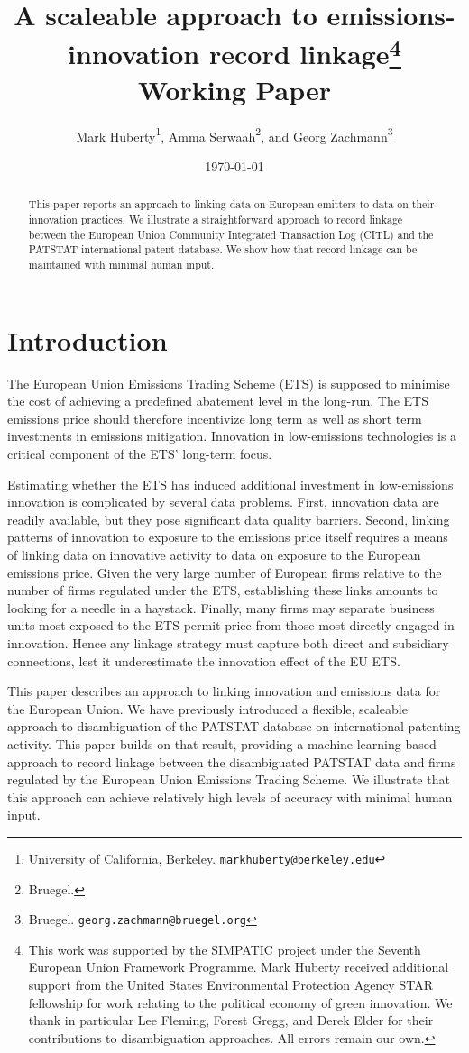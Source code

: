 \documentclass[11pt]{article}
\title{A scaleable approach to emissions-innovation record linkage\thanks{This
    work was supported by the SIMPATIC project under the Seventh European Union Framework Programme. Mark Huberty received additional support from the United States
    Environmental Protection Agency STAR fellowship for work relating to
    the political economy of green innovation. We thank in particular
    Lee Fleming, Forest Gregg, and Derek Elder for their contributions
    to disambiguation approaches. All errors remain our own.}\\
  Working Paper}
\author{Mark Huberty\thanks{University of California,
    Berkeley. \texttt{markhuberty@berkeley.edu}}, Amma
  Serwaah\thanks{Bruegel.}, and Georg Zachmann\thanks{Bruegel. \texttt{georg.zachmann@bruegel.org}}}
\date{\today}
\begin{document}
\maketitle
\doublespacing

\begin{abstract}
  This paper reports an approach to linking data on European emitters
  to data on their innovation practices. We illustrate a
  straightforward approach to record linkage between the European
  Union Community Integrated Transaction Log (CITL) and the PATSTAT
  international patent database. We show how that record linkage can
  be maintained with minimal human input. 
\end{abstract}

\section{Introduction}
\label{sec:introduction}

The European Union Emissions Trading Scheme (ETS) is supposed to
minimise the cost of achieving a predefined abatement level in the
long-run. The ETS emissions price should therefore incentivize
long term as well as short term investments in emissions
mitigation. Innovation in low-emissions technologies is a critical
component of the ETS' long-term focus.

Estimating whether the ETS has induced additional investment in
low-emissions innovation is complicated by several data
problems. First, innovation data are readily available, but they pose
significant data quality barriers. Second, linking patterns of
innovation to exposure to the emissions price itself requires a means
of linking data on innovative activity to data on exposure to the
European emissions price. Given the very large number of European
firms relative to the number of firms regulated under the ETS,
establishing these links amounts to looking for a needle in a
haystack. Finally, many firms may separate business units most exposed
to the ETS permit price from those most directly engaged in
innovation. Hence any linkage strategy must capture both direct and
subsidiary connections, lest it underestimate the innovation effect of
the EU ETS.

This paper describes an approach to linking innovation and emissions
data for the European Union. We \citep{huberty2013a} have previously
introduced a flexible, scaleable approach to disambiguation of the
PATSTAT database on international patenting activity. This paper builds on that result, providing a
machine-learning based approach to record linkage between the
disambiguated PATSTAT data and firms regulated by the European Union
Emissions Trading Scheme. We
illustrate that this approach can achieve relatively high levels of
accuracy with minimal human input.
\end{document}
